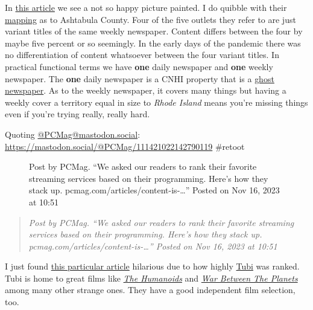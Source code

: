 In
\href{https://www.axios.com/2023/11/16/newspapers-decline-hedge-funds-research}{this
article} we see a not so happy picture painted. I do quibble with their
\href{https://localnewsinitiative.northwestern.edu/projects/state-of-local-news/explore/\#/newsNaper?state=OH&stateCode=39}{mapping}
as to Ashtabula County. Four of the five outlets they refer to are just
variant titles of the same weekly newspaper. Content differs between the
four by maybe five percent or so seemingly. In the early days of the
pandemic there was no differentiation of content whatsoever between the
four variant titles. In practical functional terms we have \textbf{one}
daily newspaper and \textbf{one} weekly newspaper. The \textbf{one}
daily newspaper is a CNHI property that is a
\href{https://www.usnewsdeserts.com/reports/expanding-news-desert/loss-of-local-news/the-rise-of-the-ghost-newspaper/}{ghost
newspaper}. As to the weekly newspaper, it covers many things but having
a weekly cover a territory equal in size to \emph{Rhode Island} means
you're missing things even if you're trying really, really hard.

Quoting \href{https://mastodon.social/@PCMag/}{@PCMag@mastodon.social}:
\url{https://mastodon.social/@PCMag/111421022142790119} \#retoot

\begin{figure}
\centering
{}
\caption{Post by PCMag. ``We asked our readers to rank their favorite
streaming services based on their programming. Here's how they stack up.
pcmag.com/articles/content-is-\ldots{}'' Posted on Nov 16, 2023 at
10:51}
\end{figure}

\begin{quote}
\emph{Post by PCMag. ``We asked our readers to rank their favorite
streaming services based on their programming. Here's how they stack up.
pcmag.com/articles/content-is-\ldots{}'' Posted on Nov 16, 2023 at
10:51}
\end{quote}

I just found
\href{https://www.pcmag.com/articles/content-is-king-which-streaming-services-have-the-best-selection}{this
particular article} hilarious due to how highly
\href{https://tubitv.com/}{Tubi} was ranked. Tubi is home to great films
like
\href{https://tubitv.com/movies/502449/the-creation-of-the-humanoids?start=false}{\emph{The
Humanoids}} and
\href{https://tubitv.com/movies/502446/war-between-the-planets}{\emph{War
Between The Planets}} among many other strange ones. They have a good
independent film selection, too.

